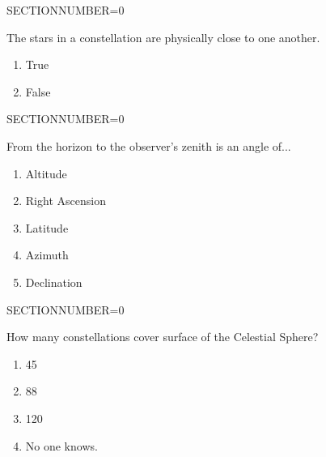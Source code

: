 \documentclass[11pt]{article}
\begin{document}
\begin{enumerate}
\begin{minipage}{\textwidth}
\begin{minipage}{\textwidth}
\end{minipage}
SECTIONNUMBER=0
\end{minipage}
\vskip 0.20in

\begin{minipage}{\textwidth}
\begin{minipage}{\textwidth}
\item The stars in a constellation are physically close to one another.
\begin{multicols}{3}
\begin{enumerate} 
\setlength{\itemsep}{1pt} 
\setlength{\parskip}{0pt} 
\setlength{\parsep}{0pt}
\setlength{\multicolsep}{1pt} 
\item True
\item False
\end{enumerate} 
\vfill 
\end{multicols}

\end{minipage}
SECTIONNUMBER=0
\end{minipage}
\vskip 0.20in

\begin{minipage}{\textwidth}
\begin{minipage}{\textwidth}
\item From the horizon to the observer's zenith is an angle of...
\begin{multicols}{3}
\begin{enumerate} 
\setlength{\itemsep}{1pt} 
\setlength{\parskip}{0pt} 
\setlength{\parsep}{0pt}
\setlength{\multicolsep}{1pt} 
\item Altitude
\item Right Ascension
\item Latitude
\item Azimuth
\item Declination
\end{enumerate} 
\vfill 
\end{multicols}

\end{minipage}
SECTIONNUMBER=0
\end{minipage}
\vskip 0.20in

\begin{minipage}{\textwidth}
\begin{minipage}{\textwidth}
\item How many constellations cover surface of the Celestial Sphere?
\begin{multicols}{3}
\begin{enumerate} 
\setlength{\itemsep}{1pt} 
\setlength{\parskip}{0pt} 
\setlength{\parsep}{0pt}
\setlength{\multicolsep}{1pt} 
\item 45
\item 88
\item 120
\item No one knows.
\end{enumerate} 
\vfill 
\end{multicols}


\end{minipage}
\end{minipage}
\end{enumerate}
\end{document}
